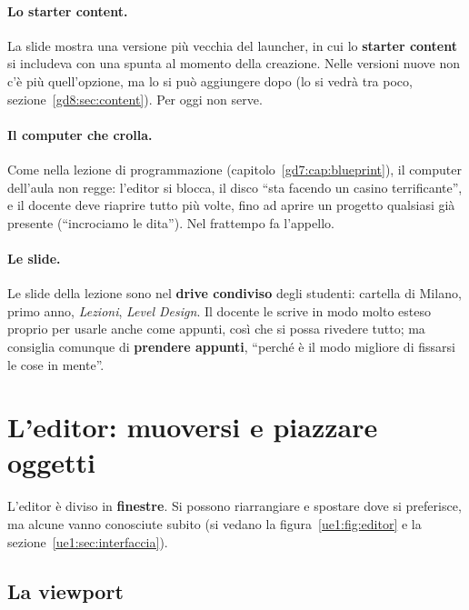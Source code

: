 \paragraph{Lo starter content.} La slide mostra una versione più vecchia del
launcher, in cui lo \textbf{starter content} si includeva con una spunta al
momento della creazione. Nelle versioni nuove non c'è più quell'opzione, ma lo
si può aggiungere dopo (lo si vedrà tra poco, sezione~\ref{gd8:sec:content}).
Per oggi non serve.

\paragraph{Il computer che crolla.} Come nella lezione di programmazione
(capitolo~\ref{gd7:cap:blueprint}), il computer dell'aula non regge: l'editor
si blocca, il disco ``sta facendo un casino terrificante'', e il docente deve
riaprire tutto più volte, fino ad aprire un progetto qualsiasi già presente
(``incrociamo le dita''). Nel frattempo fa l'appello.

\paragraph{Le slide.} Le slide della lezione sono nel \textbf{drive
condiviso} degli studenti: cartella di Milano, primo anno, \emph{Lezioni},
\emph{Level Design}. Il docente le scrive in modo molto esteso proprio per
usarle anche come appunti, così che si possa rivedere tutto; ma consiglia
comunque di \textbf{prendere appunti}, ``perché è il modo migliore di fissarsi
le cose in mente''.

\section{L'editor: muoversi e piazzare oggetti}
\label{gd8:sec:editor}



L'editor è diviso in \textbf{finestre}. Si possono riarrangiare e spostare
dove si preferisce, ma alcune vanno conosciute subito
(si vedano la figura~\ref{ue1:fig:editor} e la
sezione~\ref{ue1:sec:interfaccia}).

\subsection{La viewport}

